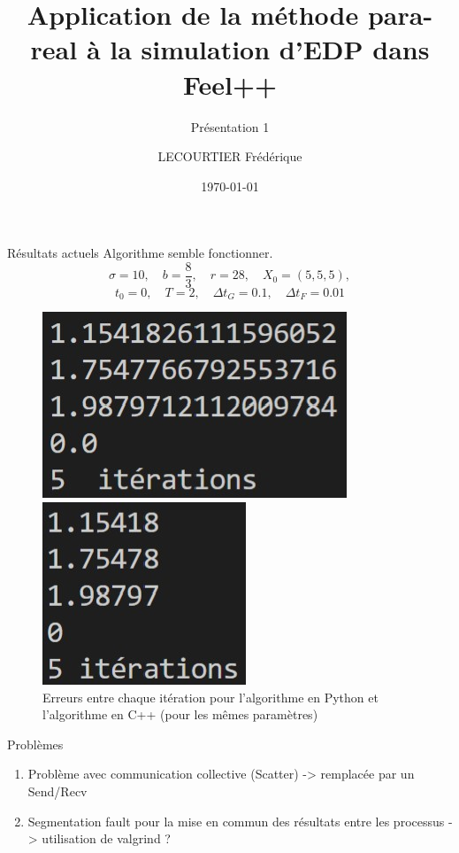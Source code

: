 \documentclass[10pt,xcolor={table,dvipsnames},t]{beamer}
\title[Lorenz]{Application de la méthode para-real à la simulation d'EDP dans Feel++}
\subtitle{Présentation 1}
\author[name]{LECOURTIER Frédérique}
\institute{\large Université de Strasbourg}
\date{\today}
\begin{document}
	
	\begin{frame}
		\titlepage
	\end{frame}

	\AtBeginSection[]{
		\begin{frame}
			\vfill
			\centering
			\begin{beamercolorbox}[sep=5pt,shadow=true,rounded=true]{subtitle}
				\usebeamerfont{title}\insertsectionhead\par%
			\end{beamercolorbox}
			\vfill
		\end{frame}
	}

	\begin{frame}{Résultats actuels}
		Algorithme semble fonctionner.
		$$\sigma=10, \quad b=\frac{8}{3}, \quad r=28, \quad X_0=(5,5,5),$$ 
		$$t_0=0, \quad T=2, \quad \Delta t_G=0.1, \quad \Delta t_F=0.01$$
		\begin{figure}
			\centering
			\begin{minipage}{0.48\linewidth}
				\centering
				\includegraphics[width=0.5\linewidth]{images/erreur_python.jpg}
			\end{minipage}
			\begin{minipage}{0.48\linewidth}
				\centering
				\includegraphics[width=0.35\linewidth]{images/erreur_cpp.jpg}
			\end{minipage}
			\caption{Erreurs entre chaque itération pour l'algorithme en Python et l'algorithme en C++ (pour les mêmes paramètres)}
		\end{figure}
	\end{frame}

	\begin{frame}{Problèmes}
		
		\begin{enumerate}[\textbullet]
			\item Problème avec communication collective (Scatter) -> remplacée par un Send/Recv
			\item Segmentation fault pour la mise en commun des résultats entre les processus -> utilisation de valgrind ?
		\end{enumerate}
	\end{frame}
\end{document}
